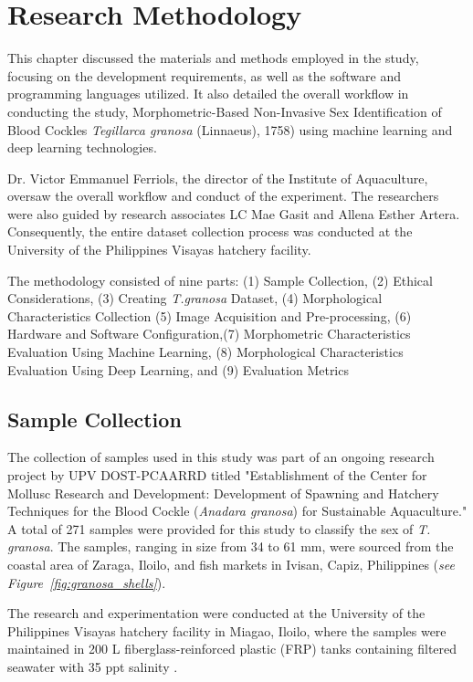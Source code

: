 \chapter{Research Methodology}
\label{sec:methodology}

This chapter discussed the materials and methods employed in the study, focusing on the development requirements, as well as the software and programming languages utilized. It also detailed the overall workflow in conducting the study, Morphometric-Based Non-Invasive Sex Identification of Blood Cockles \textit{Tegillarca granosa} (Linnaeus), 1758) using machine learning and deep learning technologies.

Dr. Victor Emmanuel Ferriols, the director of the Institute of Aquaculture, oversaw the overall workflow and conduct of the experiment. The researchers were also guided by research associates LC Mae Gasit and Allena Esther Artera. Consequently, the entire dataset collection process was conducted at the University of the Philippines Visayas hatchery facility.

The methodology consisted of nine parts: (1) Sample Collection, (2) Ethical Considerations, (3) Creating \textit{T.granosa} Dataset, (4) Morphological Characteristics Collection (5) Image Acquisition and Pre-processing, (6) Hardware and Software Configuration,(7) Morphometric Characteristics Evaluation Using Machine Learning, (8) Morphological Characteristics Evaluation Using Deep Learning, and (9) Evaluation Metrics

\section{Sample Collection}
\label{sec:samplecollect} 

The collection of \Tgranosa samples used in this study was part of an ongoing research project by UPV DOST-PCAARRD titled "Establishment of the Center for Mollusc Research and Development: Development of Spawning and Hatchery Techniques for the Blood Cockle (\textit{Anadara granosa}) for Sustainable Aquaculture." A total of 271 samples were provided for this study to classify the sex of \textit{T. granosa}. The samples, ranging in size from 34 to 61 mm, were sourced from the coastal area of Zaraga, Iloilo, and fish markets in Ivisan, Capiz, Philippines (\textit{see Figure~\ref{fig:granosa_shells}}).

The research and experimentation were conducted at the University of the Philippines Visayas hatchery facility in Miagao, Iloilo, where the samples were maintained in 200 L fiberglass-reinforced plastic (FRP) tanks containing filtered seawater with 35 ppt salinity \cite{miranda2023}.

